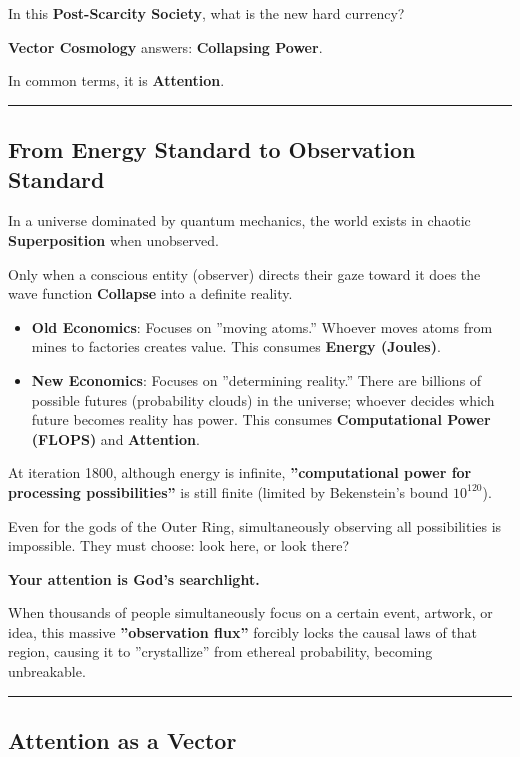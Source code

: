 In this \textbf{Post-Scarcity Society}, what is the new hard currency?

\textbf{Vector Cosmology} answers: \textbf{Collapsing Power}.

In common terms, it is \textbf{Attention}.

\hrule

\subsection{From Energy Standard to Observation Standard}

In a universe dominated by quantum mechanics, the world exists in chaotic \textbf{Superposition} when unobserved.

Only when a conscious entity (observer) directs their gaze toward it does the wave function \textbf{Collapse} into a definite reality.

\begin{itemize}
\item \textbf{Old Economics}: Focuses on ''moving atoms.'' Whoever moves atoms from mines to factories creates value. This consumes \textbf{Energy (Joules)}.

\item \textbf{New Economics}: Focuses on ''determining reality.'' There are billions of possible futures (probability clouds) in the universe; whoever decides which future becomes reality has power. This consumes \textbf{Computational Power (FLOPS)} and \textbf{Attention}.
\end{itemize}

At iteration 1800, although energy is infinite, \textbf{''computational power for processing possibilities''} is still finite (limited by Bekenstein's bound $10^{120}$).

Even for the gods of the Outer Ring, simultaneously observing all possibilities is impossible. They must choose: look here, or look there?

\textbf{Your attention is God's searchlight.}

When thousands of people simultaneously focus on a certain event, artwork, or idea, this massive \textbf{''observation flux''} forcibly locks the causal laws of that region, causing it to ''crystallize'' from ethereal probability, becoming unbreakable.

\hrule

\subsection{Attention as a Vector}

